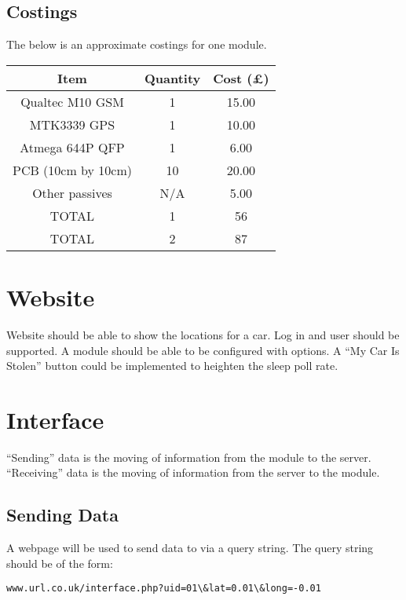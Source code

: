 \documentclass[12pt]{article}
\begin{document}
\subsection{Costings}
The below is an approximate costings for one module. 

\begin{table}[!h]
\begin{tabular}{ccc}
Item		&	Quantity	& 	Cost (\pounds) \\ \hline
Qualtec M10 GSM & 	1		& 	15.00 \\
MTK3339 GPS	&	1		&	10.00 \\
Atmega 644P QFP & 	1		&	6.00  \\
PCB (10cm by 10cm)&	10		&	20.00 \\
Other passives	&	N/A		&	5.00 \\ \hline
TOTAL		&	1		&	56 \\ \hline
TOTAL 		&	2		&	87 \\ \hline
\end{tabular}
\end{table}


\section{Website}

Website should be able to show the locations for a car. 
Log in and user should be supported. 
A module should be able to be configured with options.
A ``My Car Is Stolen'' button could be implemented to heighten the sleep poll rate. 

\section{Interface}

``Sending'' data is the moving of information from the module to the server.
``Receiving'' data is the moving of information from the server to the module.

\subsection{Sending Data}

A webpage will be used to send data to via a query string. 
The query string should be of the form:

\begin{lstlisting}
www.url.co.uk/interface.php?uid=01\&lat=0.01\&long=-0.01
\end{lstlisting}
\end{document}
